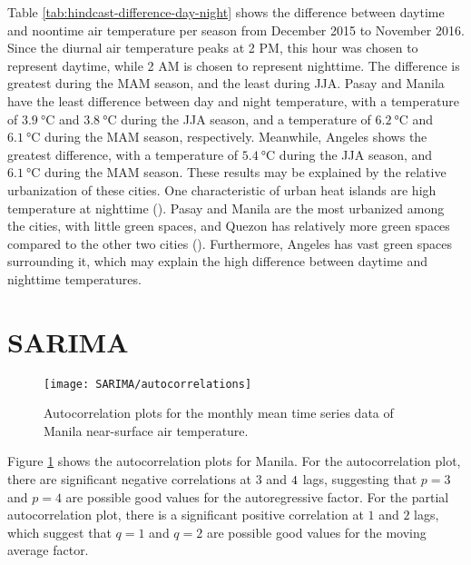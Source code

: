 	Table \ref{tab:hindcast-difference-day-night} shows the difference between daytime and noontime air temperature per season from December 2015 to November 2016.
	Since the diurnal air temperature peaks at 2 PM, this hour was chosen to represent daytime, while 2 AM is chosen to represent nighttime.
	The difference is greatest during the MAM season, and the least during JJA.
	Pasay and Manila have the least difference between day and night temperature,
		with a temperature of $\qty{3.9}{\degreeCelsius}$ and $\qty{3.8}{\degreeCelsius}$ during the JJA season,
		and a temperature of $\qty{6.2}{\degreeCelsius}$ and $\qty{6.1}{\degreeCelsius}$ during the MAM season,
		respectively.
	Meanwhile, Angeles shows the greatest difference, with a temperature of $\qty{5.4}{\degreeCelsius}$ during the JJA season, and $\qty{6.1}{\degreeCelsius}$ during the MAM season.
	These results may be explained by the relative urbanization of these cities.
	One characteristic of urban heat islands are high temperature at nighttime (\cite{Oke2017urban}).
	Pasay and Manila are the most urbanized among the cities, with little green spaces,
		and Quezon has relatively more green spaces compared to the other two cities (\cite{Bilang2022}).
	Furthermore, Angeles has vast green spaces surrounding it, which may explain the high difference between daytime and nighttime temperatures.


\section{SARIMA}
			
	\begin{figure}
		\centering
		\texttt{[image: SARIMA/autocorrelations]}
		\caption{
			Autocorrelation plots for the monthly mean time series data of Manila near-surface air temperature.
		}
		\label{fig:sarima-autocorrelations}
	\end{figure}	
	
	Figure \ref{fig:sarima-autocorrelations} shows the autocorrelation plots for Manila.
	For the autocorrelation plot, 
		there are significant negative correlations at $\num{3}$ and $\num4$ lags,
		suggesting that $p = 3$ and $p = 4$ are possible good values for the autoregressive factor.
	For the partial autocorrelation plot,
		there is a significant positive correlation at $\num{1}$ and $\num{2}$ lags,
		which suggest that $q = 1$ and $q = 2$ are possible good values for the moving average factor.
	
